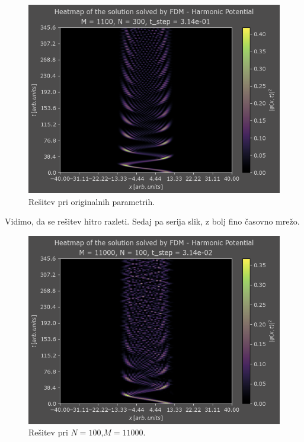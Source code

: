 \documentclass[a4paper]{article}
\begin{document}
\begin{figure}[p]
    \centering
    \includegraphics[width=\textwidth]{./images/case1_org.png}
    \caption{Rešitev pri originalnih parametrih.}
    \label{fig:harmonic_oscillator_org}
\end{figure}

Vidimo, da se rešitev hitro razleti. Sedaj pa serija slik, z bolj fino časovno mrežo.

\begin{figure}[p]
    \centering
    \includegraphics[width=\textwidth]{./images/case1_N100.png}
    \caption{Rešitev pri $N=100$,$M=11000$.}
    \label{fig:harmonic_oscillator_N100}
\end{figure}
\end{document}
